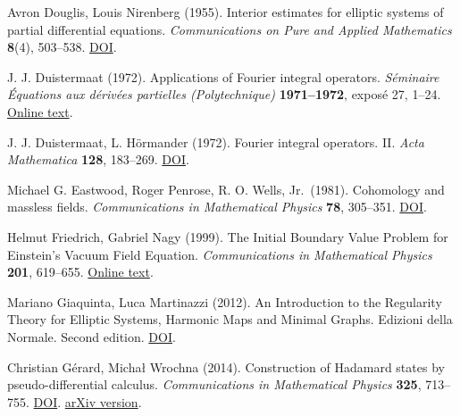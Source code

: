 \documentclass[
  english,
  11pt,
  reqno]{amsart}
\begin{document}
\begin{thebibliography}{}
\leavevmode{}\label{ref-DouglisNirenberg1955}Avron Douglis, Louis Nirenberg (1955). Interior estimates for elliptic
systems of partial differential equations. \emph{Communications on Pure
and Applied Mathematics} \textbf{8}(4), 503--538.
\href{https://doi.org/10.1002/cpa.3160080406}{DOI}.

\leavevmode{}\label{ref-Duistermaat1972FIO}J. J. Duistermaat (1972). Applications of Fourier integral operators.
\emph{Séminaire Équations aux dérivées partielles (Polytechnique)}
\textbf{1971--1972}, exposé 27, 1--24.
\href{https://www.numdam.org/article/SEDP_1971-1972____A27_0.pdf}{Online
text}.

\leavevmode{}\label{ref-DuistermaatHormander1972}J. J. Duistermaat, L. Hörmander (1972). Fourier integral operators. II.
\emph{Acta Mathematica} \textbf{128}, 183--269.
\href{https://doi.org/10.1007/BF02392165}{DOI}.

\leavevmode{}\label{ref-EastwoodPenroseWells1981}Michael G. Eastwood, Roger Penrose, R. O. Wells, Jr.~(1981). Cohomology
and massless fields. \emph{Communications in Mathematical Physics}
\textbf{78}, 305--351. \href{https://doi.org/10.1007/BF01942327}{DOI}.

\leavevmode{}\label{ref-FriedrichNagy1999}Helmut Friedrich, Gabriel Nagy (1999). The Initial Boundary Value
Problem for Einstein's Vacuum Field Equation. \emph{Communications in
Mathematical Physics} \textbf{201}, 619--655.
\href{https://users.math.msu.edu/users/gnagy/papers/hFgN99.pdf}{Online
text}.

\leavevmode{}\label{ref-GiaquintaMartinazzi2012}Mariano Giaquinta, Luca Martinazzi (2012). An Introduction to the
Regularity Theory for Elliptic Systems, Harmonic Maps and Minimal
Graphs. Edizioni della Normale. Second edition.
\href{https://doi.org/10.1007/978-88-7642-443-4}{DOI}.

\leavevmode{}\label{ref-gerard-wrochna2014}Christian Gérard, Michał Wrochna (2014). Construction of Hadamard states
by pseudo-differential calculus. \emph{Communications in Mathematical
Physics} \textbf{325}, 713--755.
\href{https://doi.org/10.1007/s00220-013-1824-9}{DOI}.
\href{https://arxiv.org/abs/1209.2604v4}{arXiv version}.


\end{thebibliography}
\end{document}

